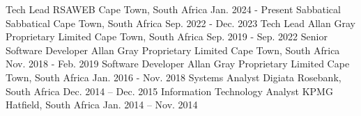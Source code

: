   \begin{cventries}
    \cventry
      {Tech Lead} %
      {RSAWEB} %
      {Cape Town, South Africa} %
      {Jan. 2024 - Present} %
      {}
    \cventry
      {Sabbatical} %
      {Sabbatical} %
      {Cape Town, South Africa} %
      {Sep. 2022 - Dec. 2023} %
      {}
    \cventry
      {Tech Lead} %
      {Allan Gray Proprietary Limited} %
      {Cape Town, South Africa} %
      {Sep. 2019 - Sep. 2022} %
      {}
    \cventry
      {Senior Software Developer} %
      {Allan Gray Proprietary Limited} %
      {Cape Town, South Africa} %
      {Nov. 2018 - Feb. 2019} %
      {}
    \cventry
      {Software Developer} %
      {Allan Gray Proprietary Limited} %
      {Cape Town, South Africa} %
      {Jan. 2016 - Nov. 2018} %
      {}
    \cventry
      {Systems Analyst} %
      {Digiata} %
      {Rosebank, South Africa} %
      {Dec. 2014 – Dec. 2015}%
      {}
    \cventry
      {Information Technology Analyst} %
      {KPMG} %
      {Hatfield, South Africa} %
      {Jan. 2014 – Nov. 2014} %
      {}
  \end{cventries}
